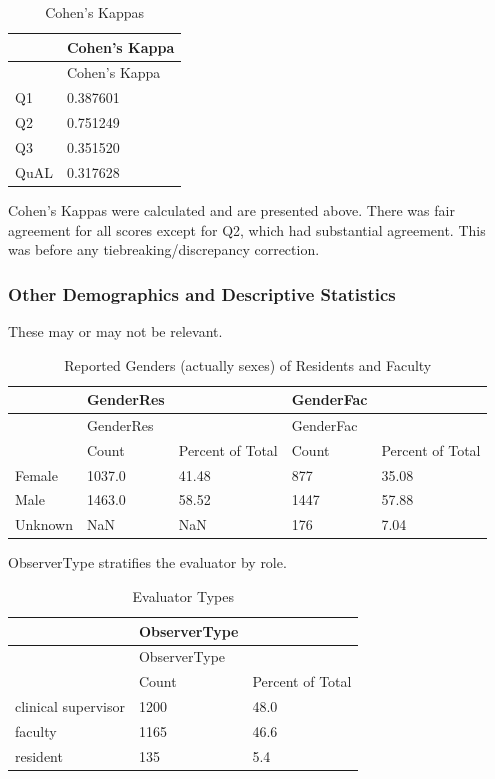 \documentclass[
  letterpaper,
  DIV=11,
  numbers=noendperiod]{scrartcl}
\begin{document}
\hypertarget{tbl-kappa}{}
\begin{longtable}[]{@{}ll@{}}
\caption{\label{tbl-kappa}Cohen's Kappas}\tabularnewline
\toprule()
& Cohen's Kappa \\
\midrule()
\endfirsthead
\toprule()
& Cohen's Kappa \\
\midrule()
\endhead
Q1 & 0.387601 \\
Q2 & 0.751249 \\
Q3 & 0.351520 \\
QuAL & 0.317628 \\
\bottomrule()
\end{longtable}

Cohen's Kappas were calculated and are presented above. There was fair
agreement for all scores except for Q2, which had substantial agreement.
This was before any tiebreaking/discrepancy correction.

\hypertarget{other-demographics-and-descriptive-statistics}{%
\subsubsection{Other Demographics and Descriptive
Statistics}\label{other-demographics-and-descriptive-statistics}}

These may or may not be relevant.

\hypertarget{tbl-gender}{}
\begin{longtable}[]{@{}lllll@{}}
\caption{\label{tbl-gender}Reported Genders (actually sexes) of
Residents and Faculty}\tabularnewline
\toprule()
& GenderRes & & GenderFac & \\
\midrule()
\endfirsthead
\toprule()
& GenderRes & & GenderFac & \\
\midrule()
\endhead
& Count & Percent of Total & Count & Percent of Total \\
Female & 1037.0 & 41.48 & 877 & 35.08 \\
Male & 1463.0 & 58.52 & 1447 & 57.88 \\
Unknown & NaN & NaN & 176 & 7.04 \\
\bottomrule()
\end{longtable}

ObserverType stratifies the evaluator by role.

\hypertarget{tbl-observertype}{}
\begin{longtable}[]{@{}lll@{}}
\caption{\label{tbl-observertype}Evaluator Types}\tabularnewline
\toprule()
& ObserverType & \\
\midrule()
\endfirsthead
\toprule()
& ObserverType & \\
\midrule()
\endhead
& Count & Percent of Total \\
clinical supervisor & 1200 & 48.0 \\
faculty & 1165 & 46.6 \\
resident & 135 & 5.4 \\
\bottomrule()
\end{longtable}
\end{document}
